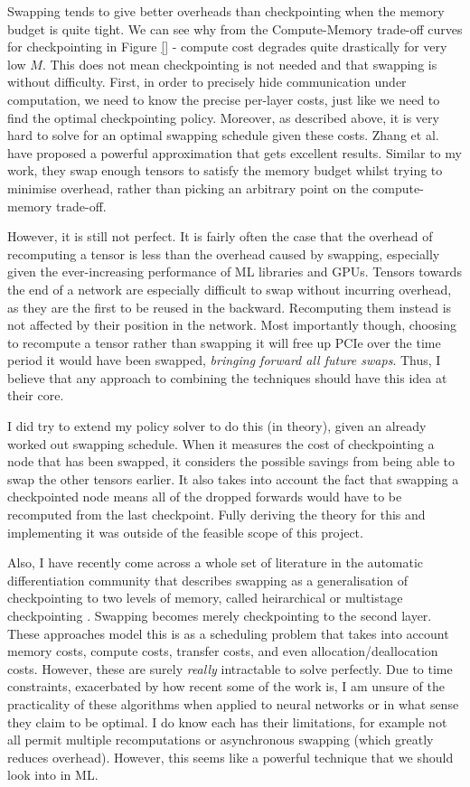 Swapping tends to give better overheads than checkpointing when the memory budget is quite tight.
We can see why from the Compute-Memory trade-off curves for checkpointing in Figure \ref{} - compute cost degrades quite drastically for very low \(M\).
This does not mean checkpointing is not needed and that swapping is without difficulty.
First, in order to precisely hide communication under computation, we need to know the precise per-layer costs, just like we need to find the optimal checkpointing policy.
Moreover, as described above, it is very hard to solve for an optimal swapping schedule given these costs.
Zhang et al. \cite{Zhang2019} have proposed a powerful approximation that gets excellent results.
Similar to my work, they swap enough tensors to satisfy the memory budget whilst trying to minimise overhead, rather than picking an arbitrary point on the compute-memory trade-off.

However, it is still not perfect.
It is fairly often the case that the overhead of recomputing a tensor is less than the overhead caused by swapping, especially given the ever-increasing performance of ML libraries and GPUs.
Tensors towards the end of a network are especially difficult to swap without incurring overhead, as they are the first to be reused in the backward.
Recomputing them instead is not affected by their position in the network.
Most importantly though, choosing to recompute a tensor rather than swapping it will free up PCIe over the time period it would have been swapped, \textit{bringing forward all future swaps}.
Thus, I believe that any approach to combining the techniques should have this idea at their core.

I did try to extend my policy solver to do this (in theory), given an already worked out swapping schedule.
When it measures the cost of checkpointing a node that has been swapped, it considers the possible savings from being able to swap the other tensors earlier.
It also takes into account the fact that swapping a checkpointed node means all of the dropped forwards would have to be recomputed from the last checkpoint.
Fully deriving the theory for this and implementing it was outside of the feasible scope of this project.

Also, I have recently come across a whole set of literature in the automatic differentiation community that describes swapping as a generalisation of checkpointing to two levels of memory, called heirarchical or multistage checkpointing \cite{Aupy2016, Schanen2016, Kukreja2018, Aupy2019}.
Swapping becomes merely checkpointing to the second layer.
These approaches model this is as a scheduling problem that takes into account memory costs, compute costs, transfer costs, and even allocation/deallocation costs.
However, these are surely \textit{really} intractable to solve perfectly.
Due to time constraints, exacerbated by how recent some of the work is, I am unsure of the practicality of these algorithms when applied to neural networks or in what sense they claim to be optimal.
I do know each has their limitations, for example not all permit multiple recomputations or asynchronous swapping (which greatly reduces overhead).
However, this seems like a powerful technique that we should look into in ML.


